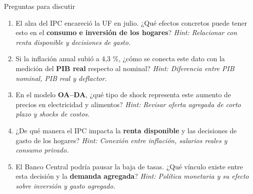 \documentclass[11pt,addpoints]{article}
\begin{document}
\begin{frame}{Preguntas para discutir}
\begin{enumerate}
  \item El alza del IPC encareció la UF en julio. ¿Qué efectos concretos puede tener esto en el \textbf{consumo e inversión de los hogares}? \textit{Hint: Relacionar con renta disponible y decisiones de gasto.}

  \item Si la inflación anual subió a 4,3 \%, ¿cómo se conecta este dato con la medición del \textbf{PIB real} respecto al nominal? \textit{Hint: Diferencia entre PIB nominal, PIB real y deflactor.}

  \item En el modelo \textbf{OA–DA}, ¿qué tipo de shock representa este aumento de precios en electricidad y alimentos? \textit{Hint: Revisar oferta agregada de corto plazo y shocks de costos.}

  \item ¿De qué manera el IPC impacta la \textbf{renta disponible} y las decisiones de gasto de los hogares? \textit{Hint: Conexión entre inflación, salarios reales y consumo privado.}

  \item El Banco Central podría pausar la baja de tasas. ¿Qué vínculo existe entre esta decisión y la \textbf{demanda agregada}? \textit{Hint: Política monetaria y su efecto sobre inversión y gasto agregado.}
\end{enumerate}
\end{frame}
\end{document}

